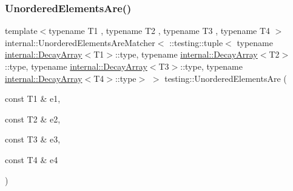 \mbox{\label{namespacetesting_a8dfb2b88d0cacb8ececc069b0b015991}} 
\subsubsection{\texorpdfstring{UnorderedElementsAre()}{UnorderedElementsAre()}\hspace{0.1cm}{\footnotesize\ttfamily [5/11]}}
{\footnotesize\ttfamily template$<$typename T1 , typename T2 , typename T3 , typename T4 $>$ \\
internal\+::\+Unordered\+Elements\+Are\+Matcher$<$ \+::testing\+::tuple$<$ typename \mbox{\hyperlink{structtesting_1_1internal_1_1_decay_array}{internal\+::\+Decay\+Array}}$<$T1$>$\+::type, typename \mbox{\hyperlink{structtesting_1_1internal_1_1_decay_array}{internal\+::\+Decay\+Array}}$<$T2$>$\+::type, typename \mbox{\hyperlink{structtesting_1_1internal_1_1_decay_array}{internal\+::\+Decay\+Array}}$<$T3$>$\+::type, typename \mbox{\hyperlink{structtesting_1_1internal_1_1_decay_array}{internal\+::\+Decay\+Array}}$<$T4$>$\+::type$>$ $>$ testing\+::\+Unordered\+Elements\+Are (\begin{DoxyParamCaption}\item[{const T1 \&}]{e1,  }\item[{const T2 \&}]{e2,  }\item[{const T3 \&}]{e3,  }\item[{const T4 \&}]{e4 }\end{DoxyParamCaption})\hspace{0.3cm}{\ttfamily [inline]}}

\mbox{\label{namespacetesting_a5e0ff76eb3f61b6c79b60311ceca73d3}} 
